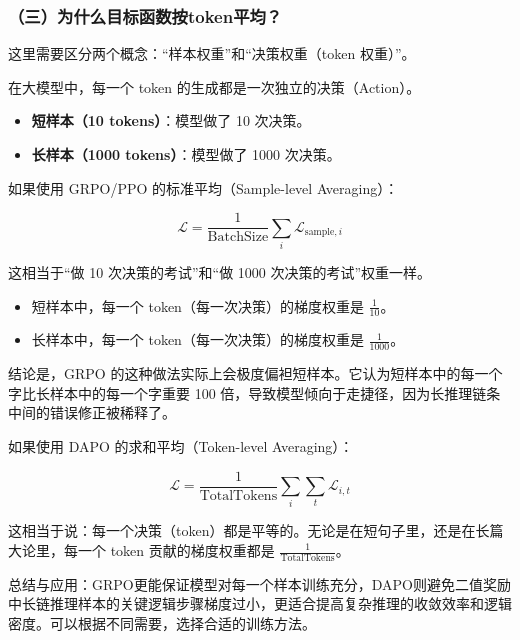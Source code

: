 \hypertarget{ux4e09ux4e3aux4ec0ux4e48ux76eeux6807ux51fdux6570ux6309tokenux5e73ux5747}{%
\subsubsection{（三）为什么目标函数按token平均？}\label{ux4e09ux4e3aux4ec0ux4e48ux76eeux6807ux51fdux6570ux6309tokenux5e73ux5747}}

这里需要区分两个概念：``样本权重''和``决策权重（token 权重）''。

在大模型中，每一个 token 的生成都是一次独立的决策（Action）。

\begin{itemize}
\tightlist
\item
  \textbf{短样本（10 tokens）}：模型做了 10 次决策。
\item
  \textbf{长样本（1000 tokens）}：模型做了 1000 次决策。
\end{itemize}

如果使用 GRPO/PPO 的标准平均（Sample-level Averaging）：

\[
\mathcal{L}
=
\frac{1}{\mathrm{BatchSize}}
\sum_i \mathcal{L}_{\mathrm{sample},i}
\]

这相当于``做 10 次决策的考试''和``做 1000 次决策的考试''权重一样。

\begin{itemize}
\tightlist
\item
  短样本中，每一个 token（每一次决策）的梯度权重是 \(\frac{1}{10}\)。
\item
  长样本中，每一个 token（每一次决策）的梯度权重是 \(\frac{1}{1000}\)。
\end{itemize}

结论是，GRPO 的这种做法实际上会极度偏袒短样本。它认为短样本中的每一个字比长样本中的每一个字重要 100 倍，导致模型倾向于走捷径，因为长推理链条中间的错误修正被稀释了。

如果使用 DAPO 的求和平均（Token-level Averaging）：

\[
\mathcal{L}
=
\frac{1}{\mathrm{TotalTokens}}
\sum_i \sum_t \mathcal{L}_{i,t}
\]

这相当于说：每一个决策（token）都是平等的。无论是在短句子里，还是在长篇大论里，每一个 token 贡献的梯度权重都是 \(\frac{1}{\mathrm{TotalTokens}}\)。

总结与应用：GRPO更能保证模型对每一个样本训练充分，DAPO则避免二值奖励中长链推理样本的关键逻辑步骤梯度过小，更适合提高复杂推理的收敛效率和逻辑密度。可以根据不同需要，选择合适的训练方法。

